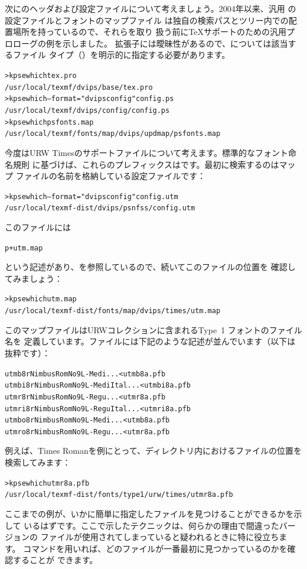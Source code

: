 \documentclass[uplatex,dvipdfmx,12pt,tombow]{jsarticle}
\begin{document}
次にのヘッダおよび設定ファイルについて考えましょう。2004年以来、汎用
の設定ファイルと\PS フォントのマップファイル%
は独自の検索パスとツリー内での配置場所を持っているので、それらを取り
扱う前に\TeX サポートのための汎用プロローグの例を示しました。
拡張子には曖昧性があるので、については該当するファイル
タイプ（）を明示的に指定する必要があります。
%
\begin{alltt}
> kpsewhich tex.pro
   /usr/local/texmf/dvips/base/tex.pro
> kpsewhich --format="dvips config" config.ps
   /usr/local/texmf/dvips/config/config.ps
> kpsewhich psfonts.map
   /usr/local/texmf/fonts/map/dvips/updmap/psfonts.map
\end{alltt}

今度はURW Timesの\PS サポートファイルについて考えます。標準的なフォント命名規則
に基づけば、これらのプレフィックスはです。最初に検索するのはマップ
ファイルの名前を格納している設定ファイルです：
%
\begin{alltt}
> kpsewhich --format="dvips config" config.utm
   /usr/local/texmf-dist/dvips/psnfss/config.utm
\end{alltt}
%
このファイルには
%
\begin{alltt}
  p +utm.map
\end{alltt}
%
という記述があり、を参照しているので、続いてこのファイルの位置を
確認してみましょう：
%
\begin{alltt}
> kpsewhich utm.map
   /usr/local/texmf-dist/fonts/map/dvips/times/utm.map
\end{alltt}
%
このマップファイルはURWコレクションに含まれるType~1 \PS フォントのファイル名を
定義しています。ファイルには下記のような記述が並んでいます（以下は抜粋です）：
%
\begin{alltt}
utmb8r  NimbusRomNo9L-Medi    ... <utmb8a.pfb
utmbi8r NimbusRomNo9L-MediItal... <utmbi8a.pfb
utmr8r  NimbusRomNo9L-Regu    ... <utmr8a.pfb
utmri8r NimbusRomNo9L-ReguItal... <utmri8a.pfb
utmbo8r NimbusRomNo9L-Medi    ... <utmb8a.pfb
utmro8r NimbusRomNo9L-Regu    ... <utmr8a.pfb
\end{alltt}
%
例えば、Times Romanを例にとって、ディレクトリ内におけるファイルの位置を検索してみます：
%
\begin{alltt}
> kpsewhich utmr8a.pfb
   /usr/local/texmf-dist/fonts/type1/urw/times/utmr8a.pfb
\end{alltt}

ここまでの例が、いかに簡単に指定したファイルを見つけることができるかを示して
いるはずです。ここで示したテクニックは、何らかの理由で間違ったバージョンの
ファイルが使用されてしまっていると疑われるときに特に役立ちます。%
コマンドを用いれば、どのファイルが一番最初に見つかっているのかを確認することが
できます。
\end{document}
